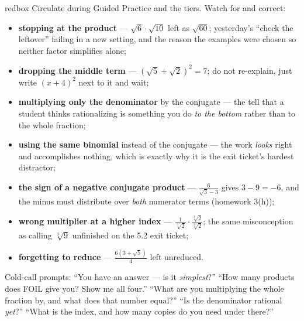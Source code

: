 \documentclass[10pt]{article}
\begin{document}
\begin{skillbox}{redbox}
Circulate during Guided Practice and the tiers. Watch for and correct:
\begin{itemize}[leftmargin=1.2em, nosep]
  \item \textbf{stopping at the product} --- $\sqrt6\cdot\sqrt{10}$ left as $\sqrt{60}$; yesterday's ``check the leftover'' failing in a new setting, and the reason the examples were chosen so neither factor simplifies alone;
  \item \textbf{dropping the middle term} --- $\left(\sqrt5+\sqrt2\right)^{2}=7$; do not re-explain, just write $(x+4)^{2}$ next to it and wait;
  \item \textbf{multiplying only the denominator} by the conjugate --- the tell that a student thinks rationalizing is something you do \emph{to the bottom} rather than to the whole fraction;
  \item \textbf{using the same binomial} instead of the conjugate --- the work \emph{looks} right and accomplishes nothing, which is exactly why it is the exit ticket's hardest distractor;
  \item \textbf{the sign of a negative conjugate product} --- $\frac{6}{\sqrt3-3}$ gives $3-9=-6$, and the minus must distribute over \emph{both} numerator terms (homework 3(h));
  \item \textbf{wrong multiplier at a higher index} --- $\frac{1}{\sqrt[3]2}\cdot\frac{\sqrt[3]2}{\sqrt[3]2}$; the same misconception as calling $\sqrt[3]{9}$ unfinished on the 5.2 exit ticket;
  \item \textbf{forgetting to reduce} --- $\frac{6\left(3+\sqrt5\right)}{4}$ left unreduced.
\end{itemize}
Cold-call prompts: ``You have an answer --- is it \emph{simplest}?'' ``How many products does FOIL
give you? Show me all four.'' ``What are you multiplying the whole fraction by, and what does that
number equal?'' ``Is the denominator rational \emph{yet}?'' ``What is the index, and how many
copies do you need under there?''
\end{skillbox}
\end{document}
